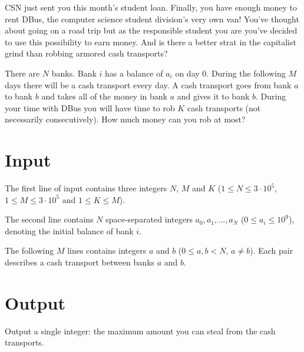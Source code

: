 \noindent
CSN just sent you this month's student loan. Finally, you have enough money to
rent DBus, the computer science student division's very own van! You've thought
about going on a road trip but as the responsible student you are you've decided
to use this possibility to earn money. And is there a better strat in the
capitalist grind than robbing armored cash transports?

There are $N$ banks. Bank $i$ has a balance of $a_i$ on day $0$. During the
following $M$ days there will be a cash transport every day. A cash transport
goes from bank $a$ to bank $b$ and takes all of the money in bank $a$ and gives
it to bank $b$. During your time with DBus you will have time to rob $K$ cash
transports (not necessarily consecutively). How much money can you rob at most?

\section*{Input}

The first line of input contains three integers $N$, $M$ and $K$ ($1 \le N \le 3
\cdot 10^5$, $1 \le M \le 3 \cdot 10^5$ and $1 \le K \le M$).

\noindent The second line contains $N$ space-separated integers $a_0, a_1, \ldots,
a_N$ ($0 \le a_i \le 10^9$), denoting the initial balance of bank $i$.

\noindent The following $M$ lines contains integers $a$ and $b$ ($0 \le a, b <
N$, $a \neq b$).  Each pair describes a cash transport between banks $a$ and
$b$.

\section*{Output}

Output a single integer: the maximum amount you can steal from the cash
transports.

